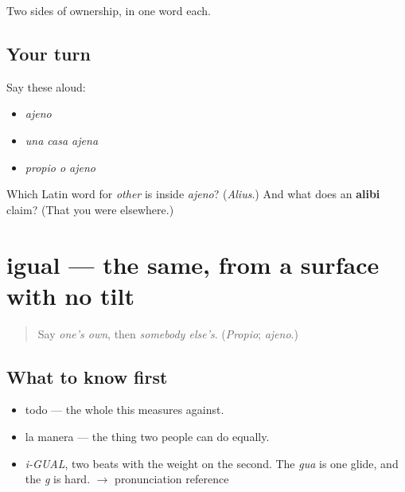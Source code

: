 \begin{grammarlens}[title={What you've built}]
Two sides of ownership, in one word each.
\end{grammarlens}

\subsection*{Your turn}
Say these aloud:

\begin{itemize}
\raggedright
  \item \emph{ajeno}
  \item \emph{una casa ajena}
  \item \emph{propio o ajeno}
\end{itemize}

\begin{tcolorbox}[breakable,colback=teal!4,colframe=teal!35!black,title={Before you move on}]
Which Latin word for \emph{other} is inside \emph{ajeno}? (\emph{Alius}.) And what does an \textbf{alibi} claim? (That you were elsewhere.)
\end{tcolorbox}
\section[igual]{igual — the same, from a surface with no tilt}

\label{lesson:ES-C350-igual}



\begin{quote}
Say \emph{one's own}, then \emph{somebody else's}. (\emph{Propio}; \emph{ajeno}.)
\end{quote}

\subsection*{What to know first}
\begin{itemize}
\raggedright
  \item todo — the whole this measures against.
  \item la manera — the thing two people can do equally.
\end{itemize}

\begin{sounds}
\begin{itemize}
\raggedright
  \item \emph{i-GUAL}, two beats with the weight on the second. The \emph{gua} is one glide, and the \emph{g} is hard. $\to$ pronunciation reference
\end{itemize}
\end{sounds}

